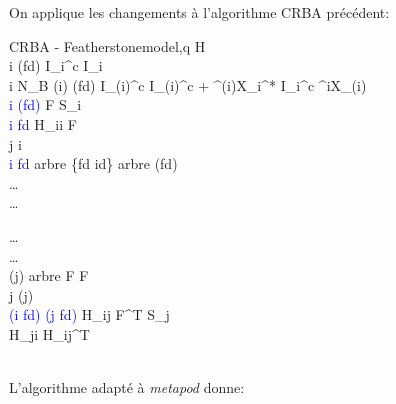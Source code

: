 \documentclass{report}
\begin{document}
\begin{flushleft}
 On applique les changements à l'algorithme CRBA précédent: \\
 \end{flushleft}

\begin{minipage}[t]{\textwidth}
\setlength{\columnseprule}{0.5pt}
\begin{multicols}{2}\raggedcolumns\small
    	\begin{spacing}{1.5}
		\begin{pseudocode}{CRBA - Featherstone}{model,q} \label{algo_crbaFeatherstoneH11H21}
    H  \\
		\FOREACH i \in \nu(fd) \DO
		  I_i^c \GETS I_i \\
		\FOR i \GETS N_B  \DO
		\BEGIN
		  \IF \lambda(i) \in \nu(fd)
		  \THEN
		    I_{\lambda(i)}^c \GETS I_{\lambda(i)}^c + {^{\lambda(i)}X_i^*} \: {I_i^c} \: {^iX_{\lambda(i)}} \\
		  \IF \textcolor{blue}{i \in \nu(fd)} \THEN
		  \BEGIN
			  F  \: S_i \\
			  \IF \textcolor{blue}{i \in fd} \THEN H_{ii}  F \\
			  j \GETS i \\
			  \IF \textcolor{blue}{i \in fd}
			  \THEN arbre \GETS \{fd \cup id\}
			  \ELSE arbre \GETS \nu(fd) \\
			  \ldots
			\END \\
			\ldots
		\END
	  \end{pseudocode}
	  
	  \begin{pseudocode}[display]{}{}
	  \DO
	  \BEGIN
	  \ldots \\
	    \THEN
		  \BEGIN
		    \ldots \\
			  \WHILE \lambda(j) \in arbre \DO
			  \BEGIN
			    F  F \\
			    j \GETS \lambda(j) \\
			    \IF \textcolor{blue}{(i \in fd) \OR (j \in fd)} \THEN
			    \BEGIN
				    H_{ij} \GETS F^T S_j \\
				    H_{ji} \GETS H_{ij}^T
			    \END
			  \END
			\END
	  \END
	  \end{pseudocode}
	  \end{spacing}
\end{multicols}
\end{minipage} \\

L'algorithme adapté à \emph{metapod} donne: \\
\end{document}
